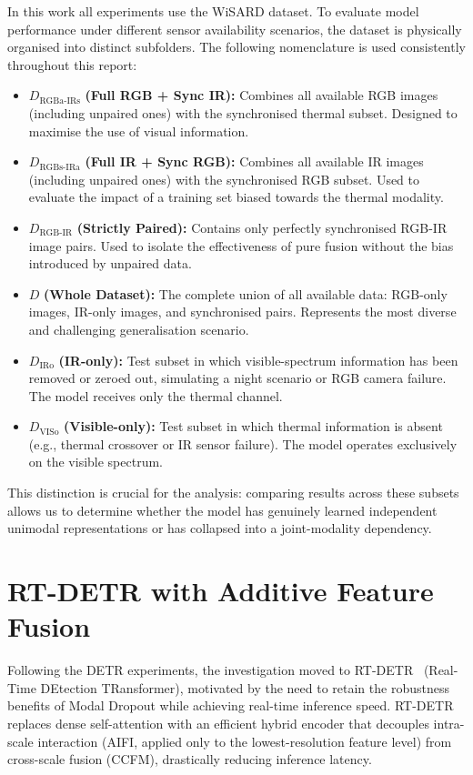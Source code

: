 \documentclass[12pt, a4paper]{article}
\begin{document}
In this work all experiments use the WiSARD dataset. To evaluate model performance under different sensor availability scenarios, the dataset is physically organised into distinct subfolders. The following nomenclature is used consistently throughout this report:
 
\begin{itemize}
    \item $D_{\text{RGBa-IRs}}$ \textbf{(Full RGB + Sync IR):} Combines all available RGB images (including unpaired ones) with the synchronised thermal subset. Designed to maximise the use of visual information.
    \item $D_{\text{RGBs-IRa}}$ \textbf{(Full IR + Sync RGB):} Combines all available IR images (including unpaired ones) with the synchronised RGB subset. Used to evaluate the impact of a training set biased towards the thermal modality.
    \item $D_{\text{RGB-IR}}$ \textbf{(Strictly Paired):} Contains only perfectly synchronised RGB-IR image pairs. Used to isolate the effectiveness of pure fusion without the bias introduced by unpaired data.
    \item $D$ \textbf{(Whole Dataset):} The complete union of all available data: RGB-only images, IR-only images, and synchronised pairs. Represents the most diverse and challenging generalisation scenario.
    \item $D_{\text{IRo}}$ \textbf{(IR-only):} Test subset in which visible-spectrum information has been removed or zeroed out, simulating a night scenario or RGB camera failure. The model receives only the thermal channel.
    \item $D_{\text{VISo}}$ \textbf{(Visible-only):} Test subset in which thermal information is absent (e.g., thermal crossover or IR sensor failure). The model operates exclusively on the visible spectrum.
\end{itemize}
 
This distinction is crucial for the analysis: comparing results across these subsets allows us to determine whether the model has genuinely learned independent unimodal representations or has collapsed into a joint-modality dependency.

\section{RT-DETR with Additive Feature Fusion}

Following the DETR experiments, the investigation moved to RT-DETR~\cite{xu2023rtdetr} (Real-Time DEtection TRansformer), motivated by the need to retain the robustness benefits of Modal Dropout while achieving real-time inference speed. RT-DETR replaces dense self-attention with an efficient hybrid encoder that decouples intra-scale interaction (AIFI, applied only to the lowest-resolution feature level) from cross-scale fusion (CCFM), drastically reducing inference latency.
\end{document}
